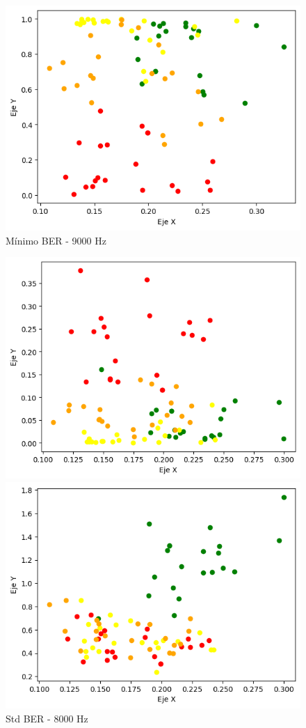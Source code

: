 \documentclass[a4paper, 12pt]{article}
\begin{document}
\begin{itemize}
\begin{itemize}
\begin{figure}[htbp]
\begin{minipage}[t]{0.5\textwidth}
                    \centering
                    \includegraphics[width=0.8\linewidth]{BER4.png}
                    \caption{Mínimo BER - 9000 Hz}
                    \label{BER 4}
                \end{minipage}
            \end{figure}
            \begin{figure}[!htbp]
                \begin{minipage}[t]{0.5\textwidth}
                    \centering
                    \includegraphics[width=0.8\linewidth]{BER5.png}
                    \caption{Std BER - 8000 Hz}
                    \label{BER 5}
                \end{minipage}%
                \begin{minipage}[t]{0.5\textwidth}
                    \centering
                    \includegraphics[width=0.8\linewidth]{BER6.png}

\end{minipage}
\end{figure}
\end{itemize}
\end{itemize}
\end{document}
